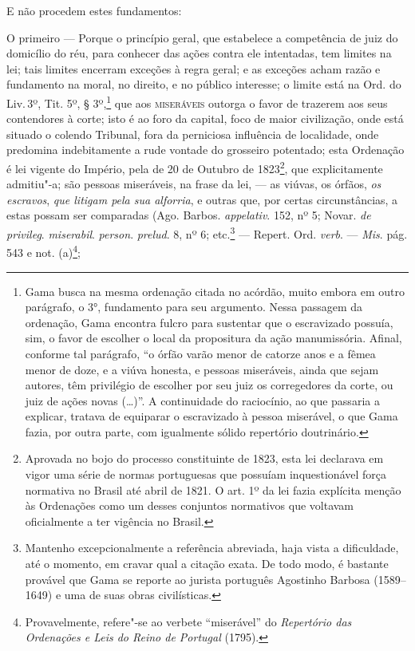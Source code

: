 E não procedem estes fundamentos:

O primeiro --- Porque o princípio geral, que estabelece a competência
de juiz do domicílio do réu, para conhecer das ações contra ele
intentadas, tem limites na lei; tais limites encerram exceções à regra
geral; e as exceções acham razão e fundamento na moral, no direito, e no
público interesse; o limite está na Ord. do Liv.\,3º, Tit. 5º, §
3º,\footnote{Gama busca na mesma ordenação citada no acórdão, muito
  embora em outro parágrafo, o 3°, fundamento para seu argumento. Nessa
  passagem da ordenação, Gama encontra fulcro para sustentar que o
  escravizado possuía, sim, o favor de escolher o local da propositura
  da ação manumissória. Afinal, conforme tal parágrafo, ``o órfão varão
  menor de catorze anos e a fêmea menor de doze, e a viúva honesta, e
  pessoas miseráveis, ainda que sejam autores, têm privilégio de
  escolher por seu juiz os corregedores da corte, ou juiz de ações novas
  (\ldots{})''. A continuidade do raciocínio, ao que passaria a explicar,
  tratava de equiparar o escravizado à pessoa miserável, o que Gama
  fazia, por outra parte, com igualmente sólido repertório doutrinário.}
que aos \textsc{miseráveis} outorga o favor de trazerem aos seus contendores à
corte; isto é ao foro da capital, foco de maior civilização, onde está
situado o colendo Tribunal, fora da perniciosa influência de localidade,
onde predomina indebitamente a rude vontade do grosseiro potentado; esta
Ordenação é lei vigente do Império, pela de 20 de Outubro de
1823\footnote{Aprovada no bojo do processo constituinte de 1823, esta
  lei declarava em vigor uma série de normas portuguesas que possuíam
  inquestionável força normativa no Brasil até abril de 1821. O art. 1º
  da lei fazia explícita menção às Ordenações como um desses conjuntos
  normativos que voltavam oficialmente a ter vigência no Brasil.}, que
explicitamente admitiu"-a; são pessoas miseráveis, na frase da lei, ---
as viúvas, os órfãos, \emph{os escravos}, \emph{que litigam pela sua
alforria}, e outras que, por certas circunstâncias, a estas possam ser
comparadas (Ago. Barbos. \emph{appelativ}. 152, nº 5; Novar. \emph{de
privileg}. \emph{miserabil}. \emph{person}. \emph{prelud}. 8, nº 6;
etc.\footnote{Mantenho excepcionalmente a referência abreviada, haja
  vista a dificuldade, até o momento, em cravar qual a citação exata. De
  todo modo, é bastante provável que Gama se reporte ao jurista
  português Agostinho Barbosa (1589--1649) e uma de suas obras
  civilísticas.} --- Repert. Ord. \emph{verb}. --- \emph{Mis}. pág. 543 e
not. (a)\footnote{Provavelmente, refere"-se ao verbete ``miserável'' do
  \emph{Repertório das Ordenações e Leis do Reino de Portugal} (1795).};
